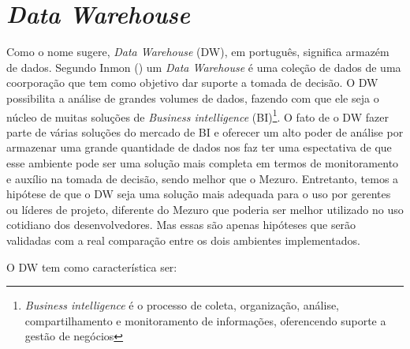 \section{\emph{Data Warehouse}}
\label{cap-dw}


Como o nome sugere, \emph{Data Warehouse} (DW), em português, significa armazém de dados. Segundo Inmon (\citeyear{inmon2002}) um \emph{Data Warehouse} é uma coleção de dados de uma coorporação que tem como objetivo dar suporte a tomada de decisão. O DW possibilita a análise de grandes volumes de dados, fazendo com que ele seja o núcleo de muitas soluções de \emph{Business intelligence} (BI)\footnote{\emph{Business intelligence} é o processo de coleta, organização, análise, compartilhamento e monitoramento de informações, oferencendo suporte a gestão de negócios}. O fato de o DW fazer parte de várias soluções do mercado de BI e oferecer um alto poder de análise por armazenar uma grande quantidade de dados nos faz ter uma espectativa de que esse ambiente pode ser uma solução mais completa em termos de monitoramento e auxílio na tomada de decisão, sendo melhor que o Mezuro. Entretanto, temos a hipótese de que o DW seja uma solução mais adequada para o uso por gerentes ou líderes de projeto, diferente do Mezuro que poderia ser melhor utilizado no uso cotidiano dos desenvolvedores. Mas essas são apenas hipóteses que serão validadas com a real comparação entre os dois ambientes implementados.


%

O DW tem como característica ser:

